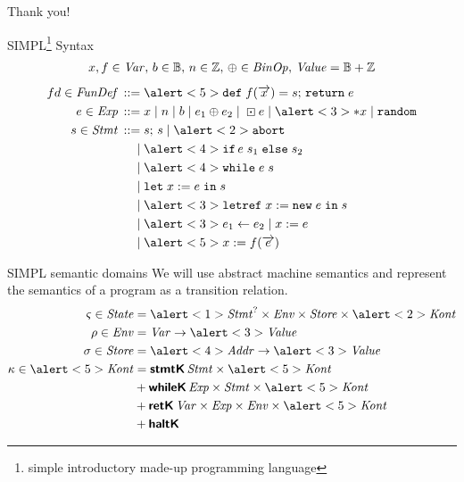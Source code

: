 \documentclass[aspectratio=169]{beamer}
\begin{document}
\begin{frame}[standout]
  Thank you!
\end{frame}

\appendix

\begin{frame}{SIMPL\footnote{simple introductory made-up programming language} Syntax}
  \vspace{-2em}
  \small
  \begin{gather*}
    x,f \in \mathit{Var},\, b \in \mathbb{B},\, n \in \mathbb{Z},\, \oplus \in \mathit{BinOp},\,\mathit{Value} = \mathbb{B} + \mathbb{Z}
  \end{gather*}\vspace{-2em}
  \begin{align*}
    fd \in \ns{FunDef} \eDEF & \alert<5>{\kw{def}\; f(\vo{x}) = s;\,\kw{return}\; e} \\
    e \in \Exp \eDEF & x \eOR n \eOR b \eOR e_1 \oplus e_2 \eOR \boxdot e \eOR \alert<3>{*x} \eOR \kw{random}  \\
    s \in \Stmt \eDEF & s;\,s \eOR \alert<2>{\kw{abort}} \\
    \eOR & \alert<4>{\kw{if}\, e\; s_1 \; \kw{else} \; s_2} \\
    \eOR & \alert<4>{\kw{while}\; e\; s} \\
    \eOR & \kw{let}\; x := e \;\kw{in}\;s \\
    \eOR & \alert<3>{\kw{letref}\; x := \kw{new}\;e \;\kw{in}\;s} \\
    \eOR & \alert<3>{e_1 \update e_2} \eOR x := e \\
    \eOR & \alert<5>{x := f(\vo{e})}
  \end{align*}
\end{frame}
\begin{frame}{SIMPL semantic domains}
  \begingroup\footnotesize We will use abstract machine semantics and represent the semantics of a program as a transition relation.\endgroup
\begin{align*}
    \varsigma \in \State & = \alert<1>{\Stmt^? \times \Env \times \Store \times \alert<2>{\Kont}} \\
    \rho \in \Env & = \Var \to \alert<3>{\Value} \\ %
    \sigma \in \Store & = \alert<4>{\Addr} \to \alert<3>{\Value} \\ %
    \kappa \in \alert<5>{\Kont} & = \sTag{stmtK}{\Stmt \times \alert<5>{\Kont}} \\
                         & \disunion \sTag{whileK}{\Exp \times \Stmt \times \alert<5>{\Kont}} \\
                         & \disunion \sTag{retK}{\Var \times \Exp \times \Env \times \alert<5>{\Kont}} \\
                         & \disunion \sTag{haltK}
\end{align*}

\end{frame}
\end{document}
